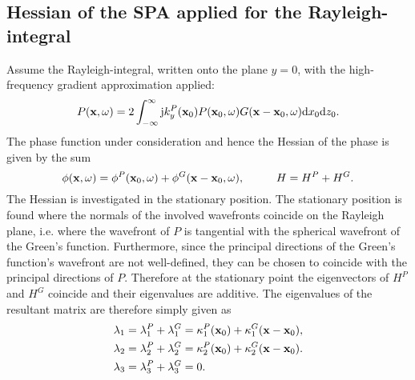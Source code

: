 \subsection{Hessian of the SPA applied for the Rayleigh-integral}

Assume the Rayleigh-integral, written onto the plane $y = 0$, with the high-frequency gradient approximation applied:
\begin{equation}
P(\mathbf{x},\omega) = 2 \int_{-\infty}^{\infty} \mathrm{j} k_y^P(\mathbf{x}_0) P(\mathbf{x}_0, \omega) G(\mathbf{x}-\mathbf{x}_0,\omega) \mathrm{d} x_0  \mathrm{d} z_0.
\end{equation}
The phase function under consideration and hence the Hessian of the phase is given by the sum
\begin{equation}
\phi(\mathbf{x},\omega) = \phi^P(\mathbf{x}_0,\omega) + \phi^G(\mathbf{x}-\mathbf{x}_0,\omega), \hspace{1cm} H = H^P+ H^G.
\end{equation}
The Hessian is investigated in the stationary position.
The stationary position is found where the normals of the involved wavefronts coincide on the Rayleigh plane, i.e. where the wavefront of $P$ is tangential with the spherical wavefront of the Green's function.
Furthermore, since the principal directions of the Green's function's wavefront are not well-defined, they can be chosen to coincide with the principal directions of $P$.
Therefore at the stationary point the eigenvectors of $H^P$ and $H^G$ coincide and their eigenvalues are additive.
The eigenvalues of the resultant matrix are therefore simply given as
\begin{align}
\lambda_1 &= \lambda_1^P + \lambda_1^G = \kappa_1^P(\mathbf{x}_0) + \kappa_1^G(\mathbf{x}-\mathbf{x}_0), \\
\lambda_2 &= \lambda_2^P + \lambda_2^G = \kappa_2^P(\mathbf{x}_0) + \kappa_2^G(\mathbf{x}-\mathbf{x}_0). \\
\lambda_3 &= \lambda_3^P + \lambda_3^G = 0.
\end{align}

